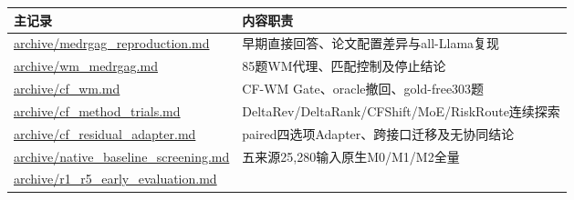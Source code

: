 \documentclass[
  11pt,
  a4paper,
]{article}
\newcounter{none} %
\begin{document}
{\def\LTcaptype{none} %
\begin{longtable}[]{@{}
  >{\raggedright\arraybackslash}p{}
  >{\raggedright\arraybackslash}p{}@{}}
\toprule\noalign{}
\begin{minipage}[b]{\linewidth}\raggedright
主记录
\end{minipage} & \begin{minipage}[b]{\linewidth}\raggedright
内容职责
\end{minipage} \\
\midrule\noalign{}
\endhead
\bottomrule\noalign{}
\endlastfoot
\href{https://github.com/xiotakut/cf_mrg/blob/main/papers/2026-10-02_cf_moa/author_dossier/records/archive/medrgag_reproduction.md}{archive/\allowbreak{}medrgag\_\allowbreak{}reproduction.\allowbreak{}md}
& 早期直接回答、论文配置差异与all-Llama复现 \\
\href{https://github.com/xiotakut/cf_mrg/blob/main/papers/2026-10-02_cf_moa/author_dossier/records/archive/wm_medrgag.md}{archive/\allowbreak{}wm\_\allowbreak{}medrgag.\allowbreak{}md}
& 85题WM代理、匹配控制及停止结论 \\
\href{https://github.com/xiotakut/cf_mrg/blob/main/papers/2026-10-02_cf_moa/author_dossier/records/archive/cf_wm.md}{archive/\allowbreak{}cf\_\allowbreak{}wm.\allowbreak{}md}
& CF-WM Gate、oracle撤回、gold-free303题 \\
\href{https://github.com/xiotakut/cf_mrg/blob/main/papers/2026-10-02_cf_moa/author_dossier/records/archive/cf_method_trials.md}{archive/\allowbreak{}cf\_\allowbreak{}method\_\allowbreak{}trials.\allowbreak{}md}
& DeltaRev/DeltaRank/CFShift/MoE/RiskRoute连续探索 \\
\href{https://github.com/xiotakut/cf_mrg/blob/main/papers/2026-10-02_cf_moa/author_dossier/records/archive/cf_residual_adapter.md}{archive/\allowbreak{}cf\_\allowbreak{}residual\_\allowbreak{}adapter.\allowbreak{}md}
& paired四选项Adapter、跨接口迁移及无协同结论 \\
\href{https://github.com/xiotakut/cf_mrg/blob/main/papers/2026-10-02_cf_moa/author_dossier/records/archive/native_baseline_screening.md}{archive/\allowbreak{}native\_\allowbreak{}baseline\_\allowbreak{}screening.\allowbreak{}md}
& 五来源25,280输入原生M0/M1/M2全量 \\
\href{https://github.com/xiotakut/cf_mrg/blob/main/papers/2026-10-02_cf_moa/author_dossier/records/archive/r1_r5_early_evaluation.md}{archive/\allowbreak{}r1\_\allowbreak{}r5\_\allowbreak{}early\_\allowbreak{}evaluation.\allowbreak{}md}

\end{longtable}}
\end{document}
